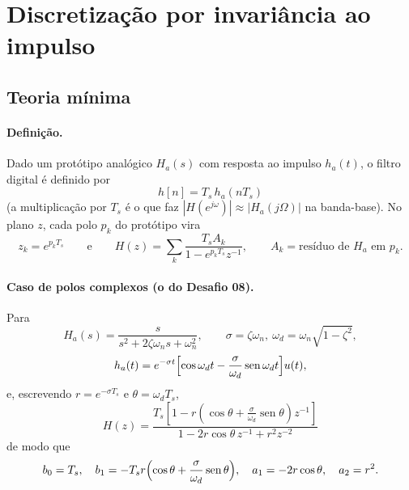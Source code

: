 \section{Discretização por invariância ao impulso}\label{sec:invimp}

\subsection*{Teoria mínima}

\paragraph{Definição.} Dado um protótipo analógico $H_a(s)$ com resposta ao
impulso $h_a(t)$, o filtro digital é definido por
\[
  \boxed{\ h[n]=T_s\,h_a(nT_s)\ }
\]
(a multiplicação por $T_s$ é o que faz $|H(e^{j\omega})|\approx|H_a(j\Omega)|$
na banda-base). No plano $z$, cada polo $p_k$ do protótipo vira
\[
  z_k=e^{p_kT_s}\qquad\text{e}\qquad
  H(z)=\sum_k\frac{T_sA_k}{1-e^{p_kT_s}z^{-1}},
  \qquad A_k=\text{resíduo de }H_a \text{ em }p_k .
\]

\paragraph{Caso de polos complexos (o do Desafio 08).} Para
\[
  H_a(s)=\frac{s}{s^2+2\zeta\omega_ns+\omega_n^2},\qquad
  \sigma=\zeta\omega_n,\ \omega_d=\omega_n\sqrt{1-\zeta^2},
\]
\[
  h_a(t)=e^{-\sigma t}\Bigl[\cos\omega_dt-\frac{\sigma}{\omega_d}
  \operatorname{sen}\omega_dt\Bigr]u(t),
\]
e, escrevendo $r=e^{-\sigma T_s}$ e $\theta=\omega_dT_s$,
\[
  \boxed{\ H(z)=\frac{T_s\left[1-r\left(\cos\theta+
  \frac{\sigma}{\omega_d}\operatorname{sen}\theta\right)z^{-1}\right]}
  {1-2r\cos\theta\,z^{-1}+r^{2}z^{-2}}\ }
\]
de modo que
\[
  b_0=T_s,\quad
  b_1=-T_sr\Bigl(\cos\theta+\frac{\sigma}{\omega_d}\operatorname{sen}\theta\Bigr),
  \quad a_1=-2r\cos\theta,\quad a_2=r^{2}.
\]

